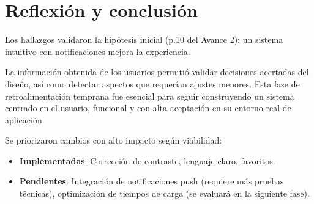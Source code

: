 \documentclass{article}
\begin{document}
\section{Reflexión y conclusión}
Los hallazgos validaron la hipótesis inicial (p.10 del Avance 2): un sistema intuitivo con notificaciones mejora la experiencia. 

La información obtenida de los usuarios permitió validar decisiones acertadas del diseño, así como detectar aspectos que requerían ajustes menores. Esta fase de retroalimentación temprana fue esencial para seguir construyendo un sistema centrado en el usuario, funcional y con alta aceptación en su entorno real de aplicación.  

Se priorizaron cambios con alto impacto según viabilidad:
\begin{itemize}
    \item \textbf{Implementadas}: Corrección de contraste, lenguaje claro, favoritos.
    \item \textbf{Pendientes}: Integración de notificaciones push (requiere más pruebas técnicas), optimización de tiempos de carga (se evaluará en la siguiente fase).
\end{itemize}
\end{document}
